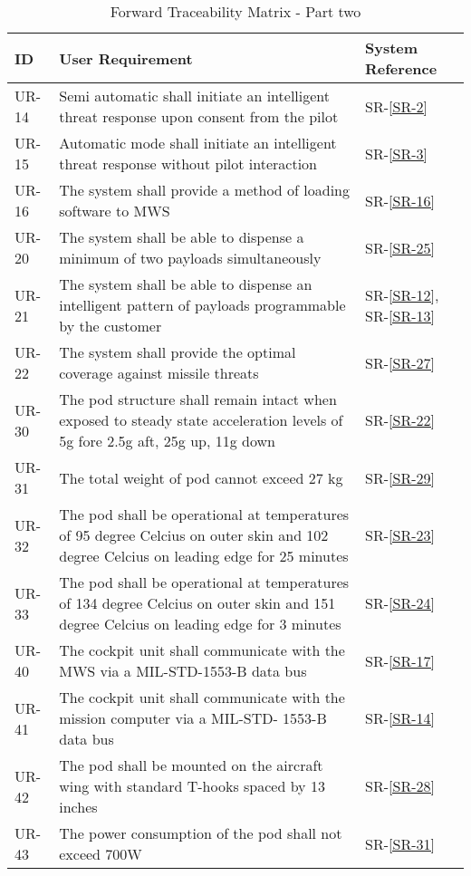 \documentclass[Main]{subfiles}
\begin{document}
\begin{table}[htbp]
	\centering
	\begin{tabular}{l p{10cm} l} \hline
	ID & User Requirement & System Reference \\\hline
	UR-14 & Semi automatic shall initiate an intelligent threat response upon consent from the pilot & SR-\ref{SR-2} \\
	UR-15 &  Automatic mode shall initiate an intelligent threat response without pilot interaction & SR-\ref{SR-3} \\
	UR-16 &  The system shall provide a method of loading software to MWS & SR-\ref{SR-16} \\
	UR-20 & The system shall be able to dispense a minimum of two payloads simultaneously & SR-\ref{SR-25} \\
	UR-21 & The system shall be able to dispense an intelligent pattern of payloads programmable
	by the customer & SR-\ref{SR-12}, SR-\ref{SR-13} \\
	UR-22 &  The system shall provide the optimal coverage against missile threats & SR-\ref{SR-27} \\
	UR-30 & The pod structure shall remain intact when exposed to steady state acceleration
	levels of 5g fore 2.5g aft, 25g up, 11g down & SR-\ref{SR-22} \\
	UR-31 & The total weight of pod cannot exceed 27 kg & SR-\ref{SR-29} \\
	UR-32 & The pod shall be operational at temperatures of 95 degree Celcius on outer skin and
	102 degree Celcius on leading edge for 25 minutes & SR-\ref{SR-23} \\
	UR-33 & The pod shall be operational at temperatures of 134 degree Celcius on outer skin
	and 151 degree Celcius on leading edge for 3 minutes  & SR-\ref{SR-24} \\
	UR-40 & The cockpit unit shall communicate with the MWS via a MIL-STD-1553-B data
	bus & SR-\ref{SR-17} \\
	UR-41 & The cockpit unit shall communicate with the mission computer via a MIL-STD-
	1553-B data bus & SR-\ref{SR-14} \\
	UR-42 &  The pod shall be mounted on the aircraft wing with standard T-hooks spaced by
	13 inches & SR-\ref{SR-28} \\
	UR-43 & The power consumption of the pod shall not exceed 700W & SR-\ref{SR-31} \\\hline
	\end{tabular}

\caption{Forward Traceability Matrix - Part two}
\label{Tab:ForwardPartTwo}
\end{table}
\end{document}
